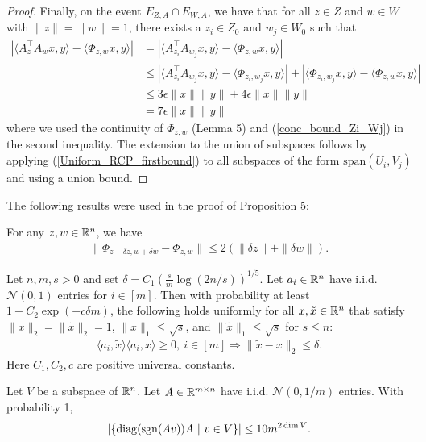 \documentclass{article}
\begin{document}
\begin{proof}
Finally, on the event $E_{Z,A} \cap E_{W,A}$, we have that for all $z \in Z$ and $w \in W$ with $\|z\| = \|w\| = 1$, there exists a $z_i \in Z_0$ and $w_j \in W_0$ such that \begin{align*}
\left|\langle A_z^\top A_w x,y \rangle - \langle \Phi_{z,w}x,y \rangle\right| & = \left|\langle A_{z_i}^\top A_{w_j} x,y \rangle - \langle \Phi_{z,w}x,y \rangle\right| \\
& \leq \left|\langle A_{z_i}^\top A_{w_j} x,y \rangle - \langle \Phi_{z_i,w_j}x,y \rangle\right| + \left|\langle \Phi_{z_i,w_j}x,y \rangle - \langle \Phi_{z,w}x,y \rangle\right| \\
& \leq 3\epsilon \|x\|\|y\| + 4\epsilon \|x\|\|y\| \\
& = 7\epsilon \|x\|\|y\|
\end{align*} where we used the continuity of $\Phi_{z,w}$ (Lemma 5) and (\ref{conc_bound_Zi_Wj}) in the second inequality. The extension to the union of subspaces follows by applying (\ref{Uniform_RCP_firstbound}) to all subspaces of the form $\text{span}(U_i,V_j)$ and using a union bound.
\end{proof}

The following results were used in the proof of Proposition 5:

\begin{lem}
For any $z,w \in \mathbb{R}^n$, we have \begin{align*}
\|\Phi_{z + \delta z,w + \delta w} - \Phi_{z,w}\| \leq 2\left(\|\delta z\| + \|\delta w\|\right).
\end{align*}
\end{lem}

\begin{thm}
Let $n,m,s > 0$ and set $\delta = C_1 \left(\frac{s}{m} \log(2n/s)\right)^{1/5}$. Let $a_i \in \mathbb{R}^n$ have i.i.d. $\mathcal{N}(0,1)$ entries for $i \in [m]$. Then with probability at least $1 - C_2 \exp(- c \delta m)$, the following holds uniformly for all $x,\tilde{x} \in \mathbb{R}^n$ that satisfy $\|x\|_2 = \|\tilde{x}\|_2 = 1$, $\|x\|_1 \leq \sqrt{s}$, and $\|\tilde{x}\|_1 \leq \sqrt{s}$ for $s \leq n$: \begin{align}
\langle a_i, \tilde{x} \rangle \langle a_i, x \rangle \geq 0,\ i \in [m] \Longrightarrow \|\tilde{x} - x\|_2 \leq \delta.
\end{align} Here $C_1, C_2, c$ are positive universal constants.
\end{thm}

\begin{lem}
Let $V$ be a subspace of $\mathbb{R}^n$. Let $A \in \mathbb{R}^{m \times n}$ have i.i.d. $\mathcal{N}(0,1/m)$ entries. With probability 1, \begin{align*}
|\{\operatorname{diag}(\operatorname{sgn}(Av))A\ |\ v \in V\}| \leq 10m^{2\operatorname{dim} V}.
\end{align*}
\end{lem}
\end{document}
